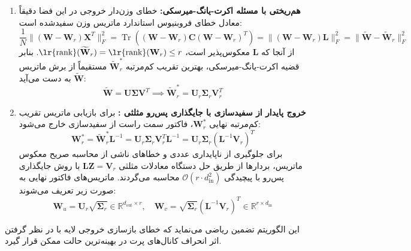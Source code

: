 \documentclass[12pt,a4paper]{report}
\theoremstyle{definition}
\begin{document}
\begin{enumerate}
    \item \textbf{هم‌ریختی با مسئله اکرت-یانگ-میرسکی:}
    خطای وزن‌دار خروجی در این فضا دقیقاً معادل خطای فروبنیوس استاندارد ماتریس وزن سفیدشده است:
    \begin{equation}
    \frac{1}{N} \| (\mathbf{W} - \mathbf{W}_r)\mathbf{X}^T \|_F^2 = \operatorname{Tr}\left( (\mathbf{W} - \mathbf{W}_r)\mathbf{C}(\mathbf{W} - \mathbf{W}_r)^T \right) = \| (\mathbf{W} - \mathbf{W}_r)\mathbf{L} \|_F^2 = \| \widetilde{\mathbf{W}} - \widetilde{\mathbf{W}}_r \|_F^2
    \end{equation}
    از آنجا که $\mathbf{L}$ معکوس‌پذیر است، $\text{\lr{rank}}(\widetilde{\mathbf{W}}_r) = \text{\lr{rank}}(\mathbf{W}_r) \le r$. بنابر قضیه اکرت-یانگ-میرسکی، بهترین تقریب کم‌مرتبه $\widetilde{\mathbf{W}}_r^*$ مستقیماً از برش  ماتریس $\widetilde{\mathbf{W}}$ به دست می‌آید:
    \begin{equation}
    \widetilde{\mathbf{W}} = \mathbf{U} \mathbf{\Sigma} \mathbf{V}^T \implies \widetilde{\mathbf{W}}_r^* = \mathbf{U}_r \mathbf{\Sigma}_r \mathbf{V}_r^T
    \end{equation}

    \item \textbf{خروج پایدار از سفیدسازی با جایگذاری پس‌رو مثلثی :}
    برای بازیابی ماتریس تقریب کم‌مرتبه نهایی $\mathbf{W}_r^*$، فاکتور سمت راست از سفیدسازی خارج می‌شود:
    \begin{equation}
    \mathbf{W}_r^* = \widetilde{\mathbf{W}}_r^* \mathbf{L}^{-1} = \mathbf{U}_r \mathbf{\Sigma}_r \mathbf{V}_r^T \mathbf{L}^{-1} = \mathbf{U}_r \mathbf{\Sigma}_r (\mathbf{L}^{-1} \mathbf{V}_r)^T
    \end{equation}
    برای جلوگیری از ناپایداری عددی و خطاهای ناشی از محاسبه صریح معکوس ماتریس، بردارها از طریق حل دستگاه معادلات مثلثی $\mathbf{L} \mathbf{Z} = \mathbf{V}_r$ با روش جایگذاری پس‌رو  با پیچیدگی $\mathcal{O}(r \cdot d_{\text{in}}^2)$ محاسبه می‌گردند. ماتریس‌های فاکتور نهایی به صورت زیر تعریف می‌شوند:
    \begin{equation}
    \mathbf{W}_u = \mathbf{U}_r \sqrt{\mathbf{\Sigma}_r} \in \mathbb{R}^{d_{\text{out}} \times r}, \quad \mathbf{W}_v = \sqrt{\mathbf{\Sigma}_r} (\mathbf{L}^{-1} \mathbf{V}_r)^T \in \mathbb{R}^{r \times d_{\text{in}}}
    \end{equation}
\end{enumerate}
این الگوریتم تضمین ریاضی می‌نماید که خطای بازسازی خروجی لایه با در نظر گرفتن اثر انحراف کانال‌های پرت در بهینه‌ترین حالت ممکن قرار گیرد.
\end{document}
